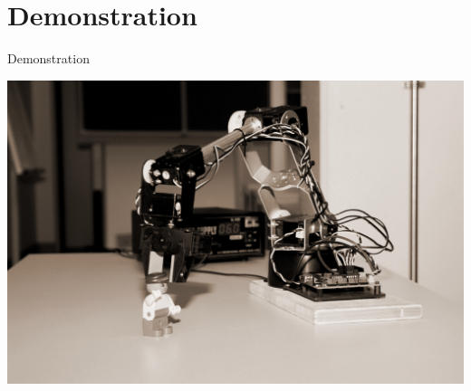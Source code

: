 \section{Demonstration}

\begin{frame}{Demonstration}
\begin{center}
\includegraphics[height=0.8\textheight]{imgs/arm.jpg}
\end{center}
\end{frame}